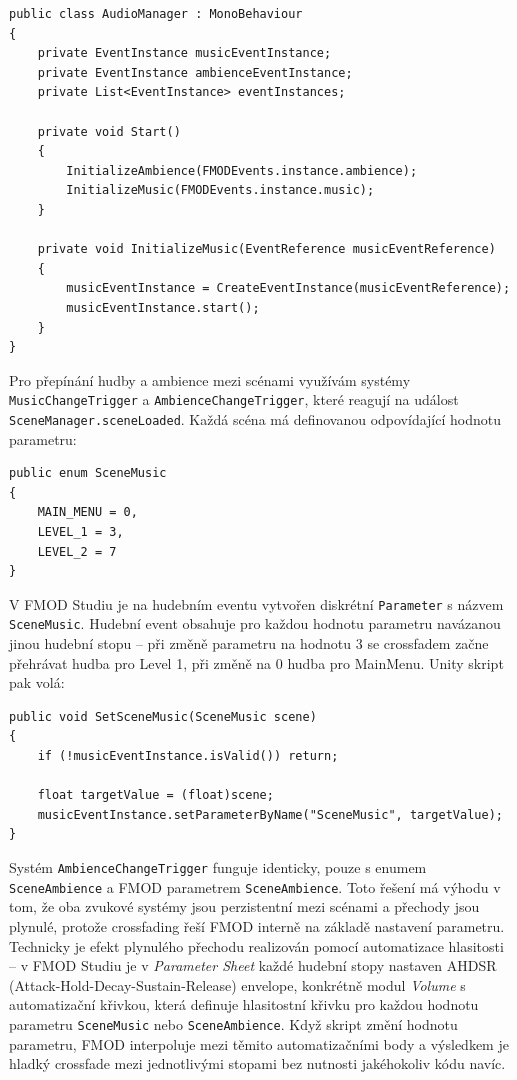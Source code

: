 \begin{lstlisting}[caption={AudioManager -- správa hudby a ambience pomocí EventInstance}, label={lst:audio-manager-music}]
public class AudioManager : MonoBehaviour
{
    private EventInstance musicEventInstance;
    private EventInstance ambienceEventInstance;
    private List<EventInstance> eventInstances;

    private void Start()
    {
        InitializeAmbience(FMODEvents.instance.ambience);
        InitializeMusic(FMODEvents.instance.music);
    }

    private void InitializeMusic(EventReference musicEventReference)
    {
        musicEventInstance = CreateEventInstance(musicEventReference);
        musicEventInstance.start();
    }
}
\end{lstlisting}

Pro přepínání hudby a ambience mezi scénami využívám systémy \texttt{MusicChangeTrigger} a \newline \texttt{AmbienceChangeTrigger}, které reagují na událost \texttt{SceneManager.sceneLoaded}. Každá scéna má definovanou odpovídající hodnotu parametru:

\begin{lstlisting}[caption={SceneMusic enum -- mapování scén na FMOD parametry}, label={lst:scenemusic-enum}]
public enum SceneMusic
{
    MAIN_MENU = 0,
    LEVEL_1 = 3,
    LEVEL_2 = 7
}
\end{lstlisting}

V FMOD Studiu je na hudebním eventu vytvořen diskrétní \texttt{Parameter} s názvem \texttt{SceneMusic}. Hudební event obsahuje pro každou hodnotu parametru navázanou jinou hudební stopu -- při změně parametru na hodnotu 3 se crossfadem začne přehrávat hudba pro Level 1, při změně na 0 hudba pro MainMenu. Unity skript pak volá:

\begin{lstlisting}[caption={MusicChangeTrigger -- změna hudby při načtení scény}, label={lst:musicchangetrigger}]
public void SetSceneMusic(SceneMusic scene)
{
    if (!musicEventInstance.isValid()) return;

    float targetValue = (float)scene;
    musicEventInstance.setParameterByName("SceneMusic", targetValue);
}
\end{lstlisting}

Systém \texttt{AmbienceChangeTrigger} funguje identicky, pouze s enumem \texttt{SceneAmbience} a FMOD parametrem \texttt{SceneAmbience}. Toto řešení má výhodu v tom, že oba zvukové systémy jsou perzistentní mezi scénami a přechody jsou plynulé, protože crossfading řeší FMOD interně na základě nastavení parametru. Technicky je efekt plynulého přechodu realizován pomocí automatizace hlasitosti -- v FMOD Studiu je v \emph{Parameter Sheet} každé hudební stopy nastaven AHDSR (Attack-Hold-Decay-Sustain-Release) envelope, konkrétně modul \emph{Volume} s automatizační křivkou, která definuje hlasitostní křivku pro každou hodnotu parametru \texttt{SceneMusic} nebo \texttt{SceneAmbience}. Když skript změní hodnotu parametru, FMOD interpoluje mezi těmito automatizačními body a výsledkem je hladký crossfade mezi jednotlivými stopami bez nutnosti jakéhokoliv kódu navíc.


